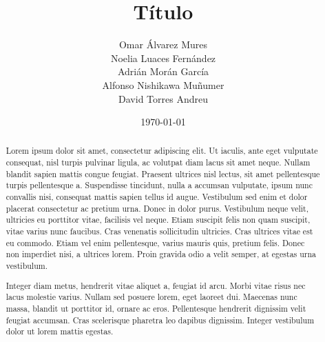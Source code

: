 \documentclass[a4paper,10pt]{report}
\title{T\'itulo}
\author{Omar \'Alvarez Mures \\
	Noelia Luaces Fern\'andez \\
	Adri\'an Mor\'an Garc\'ia \\
	Alfonso Nishikawa Mu\~numer \\
	David Torres Andreu}
\date{\today}
\begin{document}
\maketitle

\newpage

\begin{abstract}
  Lorem ipsum dolor sit amet, consectetur adipiscing elit. Ut iaculis, ante eget 
vulputate consequat, nisl turpis pulvinar ligula, ac volutpat diam lacus sit 
amet neque. Nullam blandit sapien mattis congue feugiat. Praesent ultrices nisl 
lectus, sit amet pellentesque turpis pellentesque a. Suspendisse tincidunt, 
nulla a accumsan vulputate, ipsum nunc convallis nisi, consequat mattis sapien 
tellus id augue. Vestibulum sed enim et dolor placerat consectetur ac pretium 
urna. Donec in dolor purus. Vestibulum neque velit, ultricies eu porttitor 
vitae, facilisis vel neque. Etiam suscipit felis non quam suscipit, vitae varius 
nunc faucibus. Cras venenatis sollicitudin ultricies. Cras ultrices vitae est eu 
commodo. Etiam vel enim pellentesque, varius mauris quis, pretium felis. Donec 
non imperdiet nisi, a ultrices lorem. Proin gravida odio a velit semper, at 
egestas urna vestibulum.

Integer diam metus, hendrerit vitae aliquet a, feugiat id arcu. Morbi vitae 
risus nec lacus molestie varius. Nullam sed posuere lorem, eget laoreet dui. 
Maecenas nunc massa, blandit ut porttitor id, ornare ac eros. Pellentesque 
hendrerit dignissim velit feugiat accumsan. Cras scelerisque pharetra leo 
dapibus dignissim. Integer vestibulum dolor ut lorem mattis egestas.


\end{abstract}

\newpage

\tableofcontents

\newpage

\listoftables
\listoffigures

\newpage





\renewcommand{\bibname}{Referencias}
\addcontentsline{toc}{chapter}{\bibname}


\end{document}
